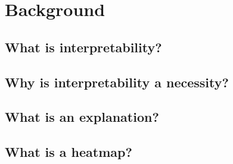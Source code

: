 \section{Background}

\subsection{What is interpretability?}
\blindtext[3]

\subsection{Why is interpretability a necessity?}
\blindtext[3]

\subsection{What is an explanation?}
\blindtext[3]

\subsection{What is a heatmap?}
\blindtext[3]